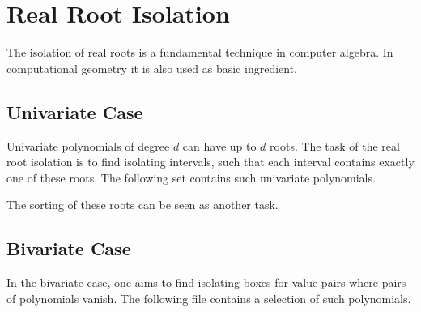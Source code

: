 \section{Real Root Isolation\label{bi_sec:RealRootIsolation}}

The isolation of real roots is a fundamental technique in computer algebra.
In computational geometry it is also used as basic ingredient. 

\subsection{Univariate Case\label{bi_ssec:univariateisolation}}

Univariate polynomials of degree $d$ can have up to $d$ roots. The task
of the real root isolation is to find isolating intervals, such that each
interval contains exactly one of these roots. The following set
contains such univariate polynomials.


The sorting of these roots can be seen as another task.

\subsection{Bivariate Case\label{bi_ssec:bivariateisolation}}

In the bivariate case, one aims to find isolating boxes for value-pairs
where pairs of polynomials vanish. The following file contains
a selection of such polynomials.

